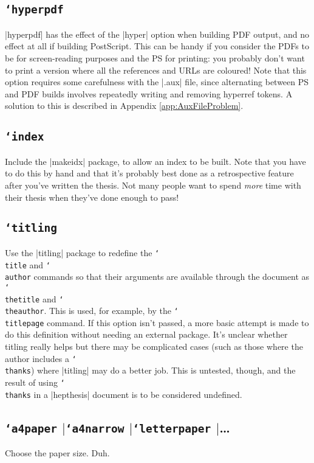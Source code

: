 \documentclass[12pt]{article}
\newcommand{\Or}{\ensuremath{\vert}\xspace}
\newcommand{\texcmd}[1]{\texttt{\char`\\#1}}
\newcommand{\texopt}[1]{\texttt{\char`#1}}
\newcommand{\texoption}[1]{\texopt{#1}}
\begin{document}
\subsection{\texoption{hyperpdf}}
|hyperpdf| has the effect of the |hyper| option when building PDF output, and no
effect at all if building PostScript. This can be handy if you consider the PDFs
to be for screen-reading purposes and the PS for printing: you probably don't
want to print a version where all the references and URLs are coloured! Note
that this option requires some carefulness with the |.aux| file, since
alternating between PS and PDF builds involves repeatedly writing and removing
hyperref tokens. A solution to this is described in Appendix \ref{app:AuxFileProblem}.

\subsection{\texopt{index}}
Include the |makeidx| package, to allow an index to be built. Note that you have
to do this by hand and that it's probably best done as a retrospective feature
after you've written the thesis. Not many people want to spend \emph{more} time
with their thesis when they've done enough to pass!

\subsection{\texopt{titling}}
Use the |titling| package to redefine the \texcmd{title} and \texcmd{author}
commands so that their arguments are available through the document as
\texcmd{thetitle} and \texcmd{theauthor}. This is used, for example, by the
\texcmd{titlepage} command. If this option isn't passed, a more basic attempt is
made to do this definition without needing an external package.  It's unclear
whether titling really helps but there may be complicated cases (such as those
where the author includes a \texcmd{thanks}) where |titling| may do a better
job. This is untested, though, and the result of using \texcmd{thanks} in a
|hepthesis| document is to be considered undefined.

\subsection{\texopt{a4paper} \Or \texoption{a4narrow} \Or \texoption{letterpaper} \Or \dots}
Choose the paper size. Duh.

\end{document}

